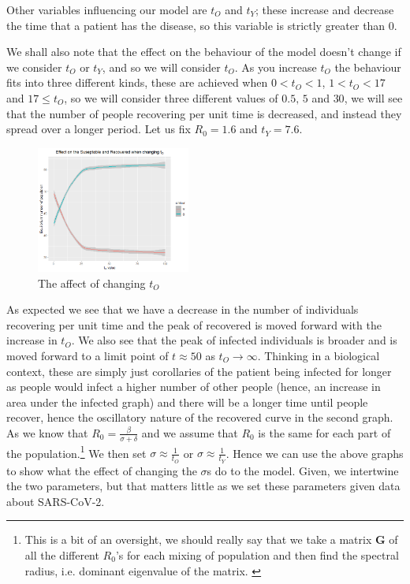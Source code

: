 \documentclass{article}
\begin{document}
\noindent
Other variables influencing our model are $t_O$ and $t_Y$; these increase and decrease the time that a patient has the disease, so this variable is strictly greater than $0$.






We shall also note that the effect on the behaviour of the model doesn't change if we consider $t_O$ or $t_Y$, and so we will consider $t_O$. As you increase $t_O$ the behaviour fits into three different kinds, these are achieved when $0 < t_O < 1$, $1 < t_O < 17$ and $17 \le t_O$, so we will consider three different values of $0.5, \, 5$ and $30$, we will see that the number of people recovering per unit time is decreased, and instead they spread over a longer period. Let us fix $R_0 = 1.6$ and $t_Y = 7.6$.\\


\begin{figure}[ht!]
\begin{center}
      \includegraphics[width=0.45\textwidth]{./figures/MarioPlt/tOSusRec.png}
      \end{center}
\caption{The affect of changing $t_O$}
\end{figure}

\newpage
\noindent
As expected we see that we have a decrease in the number of individuals recovering per unit time and the peak of recovered is moved forward with the increase in $t_O$. We also see that the peak of infected individuals is broader and is moved forward to a limit point of $t \approx 50$ as $t_O \to \infty$. Thinking in a biological context, these are simply just corollaries of the patient being infected for longer as people would infect a higher number of other people (hence, an increase in area under the infected graph) and there will be a longer time until people recover, hence the oscillatory nature of the recovered curve in the second graph. \\
\noindent
As we know that $\displaystyle{R_0 = \frac{\beta}{\sigma + \delta}}$ and we assume that $R_0$ is the same for each part of the population.\footnote{This is a bit of an oversight, we should really say that we take a matrix $\mathbf{G}$ of all the different $R_0$'s for each mixing of population and then find the spectral radius, i.e. dominant eigenvalue of the matrix. \cite{r0paper}}
 We then set $\sigma \approx \frac{1}{t_O}$ or $\sigma \approx \frac{1}{t_Y}$. Hence we can use the above graphs to show what the effect of changing the $\sigma$s do to the model. Given, we intertwine the two parameters, but that matters little as we set these parameters given data about SARS-CoV-2.\\
 
\end{document}
